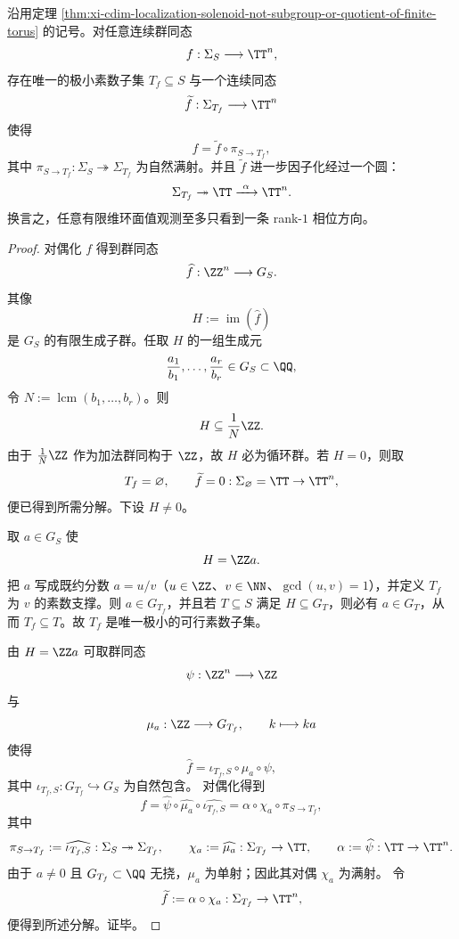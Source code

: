 \begin{theorem}[所有有限维环面值观测都因子化为单一相位通道]\label{thm:xi-cdim-localization-solenoid-torus-observation-single-phase-factorization}
沿用定理 \ref{thm:xi-cdim-localization-solenoid-not-subgroup-or-quotient-of-finite-torus} 的记号。对任意连续群同态
\[
f:\Sigma_S\longrightarrow \TT^n,
\]
存在唯一的极小素数子集 \(T_f\subseteq S\) 与一个连续同态
\[
\widetilde f:\Sigma_{T_f}\longrightarrow \TT^n
\]
使得
\[
f=\widetilde f\circ \pi_{S\to T_f},
\]
其中 \(\pi_{S\to T_f}:\Sigma_S\twoheadrightarrow \Sigma_{T_f}\) 为自然满射。并且 \(\widetilde f\) 进一步因子化经过一个圆：
\[
\Sigma_{T_f}\twoheadrightarrow \TT\xrightarrow{\ \alpha\ }\TT^n.
\]
换言之，任意有限维环面值观测至多只看到一条 rank-\(1\) 相位方向。
\end{theorem}
\begin{proof}
对偶化 \(f\) 得到群同态
\[
\widehat f:\ZZ^n\longrightarrow G_S.
\]
其像
\[
H:=\operatorname{im}(\widehat f)
\]
是 \(G_S\) 的有限生成子群。任取 \(H\) 的一组生成元
\[
\frac{a_1}{b_1},\dots,\frac{a_r}{b_r}\in G_S\subset\QQ,
\]
令 \(N:=\operatorname{lcm}(b_1,\dots,b_r)\)。则
\[
H\subseteq \frac1N\ZZ.
\]
由于 \(\frac1N\ZZ\) 作为加法群同构于 \(\ZZ\)，故 \(H\) 必为循环群。若 \(H=0\)，则取
\[
T_f=\varnothing,\qquad \widetilde f=0:\Sigma_{\varnothing}=\TT\to \TT^n,
\]
便已得到所需分解。下设 \(H\neq 0\)。

取 \(a\in G_S\) 使
\[
H=\ZZ a.
\]
把 \(a\) 写成既约分数 \(a=u/v\)（\(u\in\ZZ\)、\(v\in\NN\)、\(\gcd(u,v)=1\)），并定义 \(T_f\) 为 \(v\) 的素数支撑。则 \(a\in G_{T_f}\)，并且若 \(T\subseteq S\) 满足 \(H\subseteq G_T\)，则必有 \(a\in G_T\)，从而 \(T_f\subseteq T\)。故 \(T_f\) 是唯一极小的可行素数子集。

由 \(H=\ZZ a\) 可取群同态
\[
\psi:\ZZ^n\longrightarrow \ZZ
\]
与
\[
\mu_a:\ZZ\longrightarrow G_{T_f},
\qquad
k\longmapsto ka
\]
使得
\[
\widehat f
=
\iota_{T_f,S}\circ \mu_a\circ \psi,
\]
其中 \(\iota_{T_f,S}:G_{T_f}\hookrightarrow G_S\) 为自然包含。
对偶化得到
\[
f
=
\widehat\psi\circ \widehat{\mu_a}\circ \widehat{\iota_{T_f,S}}
=
\alpha\circ \chi_a\circ \pi_{S\to T_f},
\]
其中
\[
\pi_{S\to T_f}:=\widehat{\iota_{T_f,S}}:\Sigma_S\twoheadrightarrow \Sigma_{T_f},
\qquad
\chi_a:=\widehat{\mu_a}:\Sigma_{T_f}\to \TT,
\qquad
\alpha:=\widehat\psi:\TT\to \TT^n.
\]
由于 \(a\neq 0\) 且 \(G_{T_f}\subset\QQ\) 无挠，\(\mu_a\) 为单射；因此其对偶 \(\chi_a\) 为满射。
令
\[
\widetilde f:=\alpha\circ \chi_a:\Sigma_{T_f}\to \TT^n,
\]
便得到所述分解。证毕。
\end{proof}

